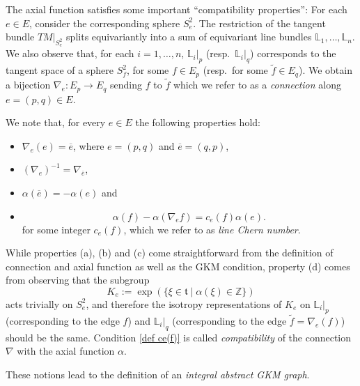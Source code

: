 \documentclass[12pt,a4paper]{amsart}
\newcommand{\ZZ}{\mathbb{Z}}
\theoremstyle{plain}
\theoremstyle{definition}
\begin{document}
The axial function satisfies some important ``compatibility properties'': For each $e\in E$, consider the corresponding sphere $S^2_e$.
The restriction of the tangent bundle $TM|_{S^2_e}$ splits
equivariantly into a sum of equivariant line bundles $\mathbb{L}_1,\ldots,\mathbb{L}_n$.
We also observe that, for each $i=1,\ldots,n$, $\mathbb{L}_i|_p$ (resp.\ $\mathbb{L}_i|_q$) corresponds to the tangent space of a sphere $S^2_f$,
for some $f\in E_p$ (resp.\ for some $\widetilde{f}\in E_q$). 
We obtain a bijection $\nabla_e\colon E_p \to E_q$ sending $f$ to
$\widetilde{f}$ which we refer to as a \emph{connection} along $e=(p,q)\in E$.

We note that, for every $e\in E$
the following properties hold:
\begin{itemize}
\item[(a)] $\nabla_e(e)=\overline{e}$, where $e=(p,q)$ and $\overline{e}=(q,p)$,
\item[(b)] $(\nabla_e)^{-1}=\nabla_{\overline{e}}$, 
\item[(c)] $\alpha(\overline{e})=-\alpha(e)$ and
\item[(d)] 
\begin{equation}\label{def ce(f)}
			\alpha(f) - \alpha(\nabla_{e}f) = c_{e}(f) \alpha(e). 
		\end{equation}
		for some integer $c_e(f)$, which we refer to as \emph{line Chern number}.
\end{itemize}
While properties (a), (b) and (c) come straightforward from the definition of connection and axial function as well as the GKM condition, property (d) comes from observing
that the subgroup $$K_e:=\exp(\{\xi\in \mathfrak{t}\mid \alpha(\xi)\in \ZZ\})$$ acts trivially on $S^2_e$, and therefore the isotropy
representations of $K_e$ on $\mathbb{L}_i|_p$ (corresponding to the edge $f$) and $\mathbb{L}_i|_q$ (corresponding
to the edge $\widetilde{f}=\nabla_e(f)$) should be the same. Condition \eqref{def ce(f)} is called \emph{compatibility} of the connection $\nabla$ with the
axial function $\alpha$. 

These notions lead to the definition of an \emph{integral abstract GKM graph}.
\end{document}
